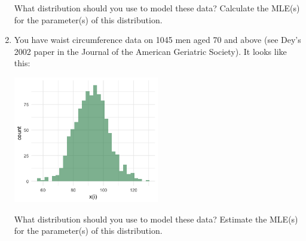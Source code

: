 \begin{enumerate}
What distribution should you use to model these data? Calculate the MLE(s) for the parameter(s) of this distribution.
\vspace{3mm}

\item You have waist circumference data on 1045 men aged 70 and above (see Dey's 2002 paper in the Journal of the American Geriatric Society). It looks like this:

\begin{center}
\includegraphics[width=0.5\textwidth]{img/l01-problem5.png}
\end{center}
\vspace{3mm}

What distribution should you use to model these data? Estimate the MLE(s) for the parameter(s) of this distribution.

\end{enumerate}
